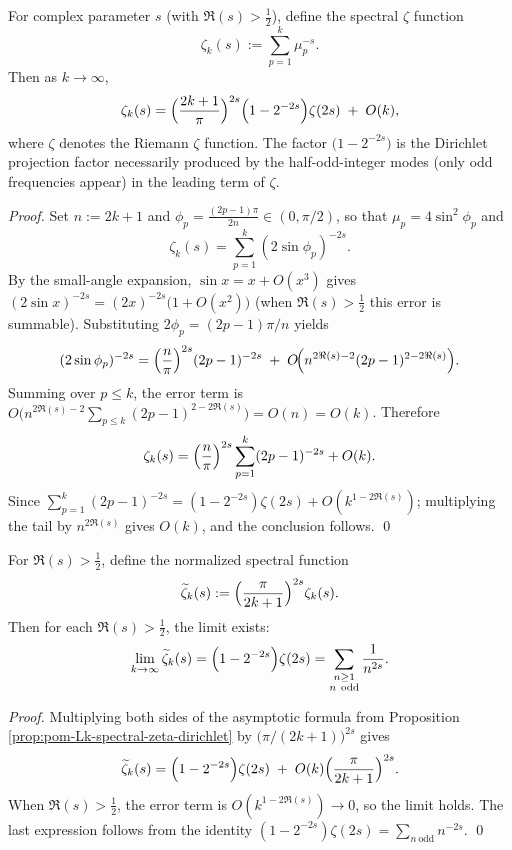 \begin{proposition}\label{prop:pom-Lk-spectral-zeta-dirichlet}
For complex parameter \(s\) (with \(\Re(s)>\tfrac12\)), define the spectral \(\zeta\) function
\[
\zeta_k(s):=\sum_{p=1}^{k}\mu_p^{-s}.
\]
Then as \(k\to\infty\),
\[
\zeta_k(s)
=\Bigl(\frac{2k+1}{\pi}\Bigr)^{2s}\Bigl(1-2^{-2s}\Bigr)\zeta(2s)
\;+\;O(k),
\]
where \(\zeta\) denotes the Riemann \(\zeta\) function.
The factor \(\bigl(1-2^{-2s}\bigr)\) is the Dirichlet projection factor necessarily produced by the half-odd-integer modes (only odd frequencies appear) in the leading term of \(\zeta\).
\end{proposition}
\begin{proof}
Set \(n:=2k+1\) and \(\phi_p=\frac{(2p-1)\pi}{2n}\in(0,\pi/2)\), so that \(\mu_p=4\sin^2\phi_p\) and
\[
\zeta_k(s)=\sum_{p=1}^{k}(2\sin\phi_p)^{-2s}.
\]
By the small-angle expansion, \(\sin x=x+O(x^3)\) gives \((2\sin x)^{-2s}=(2x)^{-2s}\bigl(1+O(x^2)\bigr)\) (when \(\Re(s)>\tfrac12\) this error is summable).
Substituting \(2\phi_p=(2p-1)\pi/n\) yields
\[
(2\sin\phi_p)^{-2s}
=\Bigl(\frac{n}{\pi}\Bigr)^{2s}(2p-1)^{-2s}
\;+\;O\!\Bigl(n^{2\Re(s)-2}(2p-1)^{2-2\Re(s)}\Bigr).
\]
Summing over \(p\le k\), the error term is
\(
O\bigl(n^{2\Re(s)-2}\sum_{p\le k}(2p-1)^{2-2\Re(s)}\bigr)=O(n)=O(k)
\).
Therefore
\[
\zeta_k(s)=\Bigl(\frac{n}{\pi}\Bigr)^{2s}\sum_{p=1}^{k}(2p-1)^{-2s}+O(k).
\]
Since \(\sum_{p=1}^{k}(2p-1)^{-2s}=(1-2^{-2s})\zeta(2s)+O(k^{1-2\Re(s)})\);
multiplying the tail by \(n^{2\Re(s)}\) gives \(O(k)\), and the conclusion follows. \qed
\end{proof}

\begin{corollary}\label{cor:pom-Lk-normalized-zeta-odd-projection}
For \(\Re(s)>\tfrac12\), define the normalized spectral function
\[
\widetilde\zeta_k(s):=\Bigl(\frac{\pi}{2k+1}\Bigr)^{2s}\zeta_k(s).
\]
Then for each \(\Re(s)>\tfrac12\), the limit exists:
\[
\lim_{k\to\infty}\widetilde\zeta_k(s)
=\Bigl(1-2^{-2s}\Bigr)\zeta(2s)
=\sum_{\substack{n\ge 1\\ n\ \mathrm{odd}}}\frac{1}{n^{2s}}.
\]
\end{corollary}
\begin{proof}
Multiplying both sides of the asymptotic formula from Proposition \ref{prop:pom-Lk-spectral-zeta-dirichlet} by \(\bigl(\pi/(2k+1)\bigr)^{2s}\) gives
\[
\widetilde\zeta_k(s)
=\Bigl(1-2^{-2s}\Bigr)\zeta(2s)
\;+\;
O(k)\Bigl(\frac{\pi}{2k+1}\Bigr)^{2s}.
\]
When \(\Re(s)>\tfrac12\), the error term is \(O(k^{1-2\Re(s)})\to 0\), so the limit holds.
The last expression follows from the identity
\(
(1-2^{-2s})\zeta(2s)=\sum_{n\ \mathrm{odd}} n^{-2s}
\).
\qed
\end{proof}

